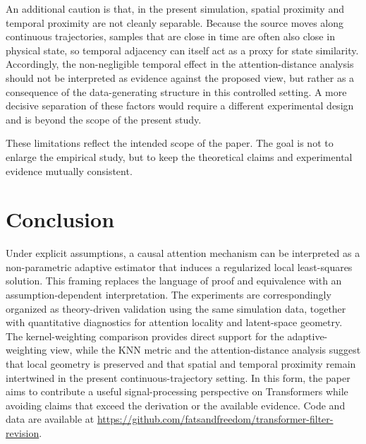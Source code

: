 \documentclass[conference]{IEEEtran}
\begin{document}
An additional caution is that, in the present simulation, spatial proximity and temporal proximity are not cleanly separable. Because the source moves along continuous trajectories, samples that are close in time are often also close in physical state, so temporal adjacency can itself act as a proxy for state similarity. Accordingly, the non-negligible temporal effect in the attention-distance analysis should not be interpreted as evidence against the proposed view, but rather as a consequence of the data-generating structure in this controlled setting. A more decisive separation of these factors would require a different experimental design and is beyond the scope of the present study.

These limitations reflect the intended scope of the paper. The goal is not to enlarge the empirical study, but to keep the theoretical claims and experimental evidence mutually consistent.

\section{Conclusion}
\label{sec:conclusion}
Under explicit assumptions, a causal attention mechanism can be interpreted as a non-parametric adaptive estimator that induces a regularized local least-squares solution. This framing replaces the language of proof and equivalence with an assumption-dependent interpretation. The experiments are correspondingly organized as theory-driven validation using the same simulation data, together with quantitative diagnostics for attention locality and latent-space geometry. The kernel-weighting comparison provides direct support for the adaptive-weighting view, while the KNN metric and the attention-distance analysis suggest that local geometry is preserved and that spatial and temporal proximity remain intertwined in the present continuous-trajectory setting. In this form, the paper aims to contribute a useful signal-processing perspective on Transformers while avoiding claims that exceed the derivation or the available evidence.
Code and data are available at \url{https://github.com/fatsandfreedom/transformer-filter-revision}.



\end{document}
